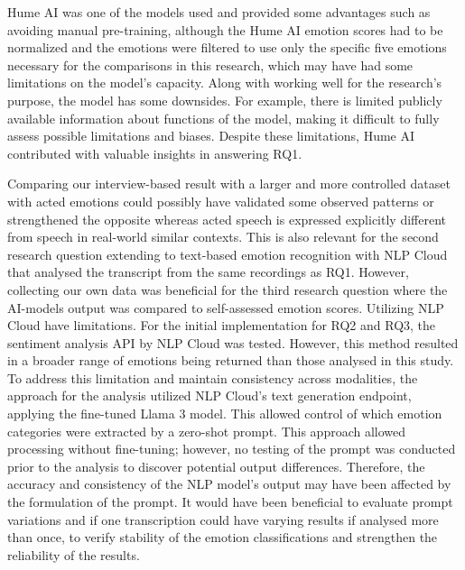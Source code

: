 Hume AI was one of the models used and provided some advantages such as avoiding manual
pre-training, although the Hume AI emotion scores had to be normalized and the emotions were filtered to use only the specific five emotions necessary for the comparisons in this research, which may have had some limitations on the model’s capacity. Along with
working well for the research’s purpose, the model has some downsides. For example, there is limited publicly available information about functions of the model, making it diﬀicult to fully assess possible limitations and biases. Despite these limitations, Hume AI contributed with valuable insights in answering RQ1.

\medskip
Comparing our interview-based result with a larger and more controlled dataset with acted emotions could possibly have validated some observed patterns or strengthened the opposite whereas acted speech is expressed explicitly different from speech in real-world similar contexts. This is also relevant for the second research question extending to text-based emotion recognition with NLP Cloud that analysed the transcript from the same recordings as RQ1. However, collecting our own data was beneficial for the third research question where the AI-models output was compared to self-assessed emotion scores. 
Utilizing NLP Cloud have limitations. 
For the initial implementation for RQ2 and RQ3, the sentiment analysis API by NLP Cloud was tested. However, this method resulted in a broader range of emotions being returned than those analysed in this study. To address this limitation and maintain consistency across modalities, the approach for the analysis utilized NLP Cloud’s text generation endpoint, applying the fine-tuned Llama 3 model. This allowed control of which emotion categories were extracted by a zero-shot prompt. This approach allowed processing without fine-tuning; however, no testing of the prompt was conducted prior to the analysis to discover potential output differences. Therefore, the accuracy and consistency of the NLP model’s output may have been affected by the formulation of the prompt. It would have been beneficial to evaluate prompt variations and if one transcription could have varying results if analysed more than once, to verify stability of the emotion classifications and strengthen the reliability of the results.  

